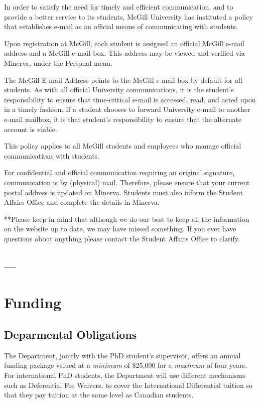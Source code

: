 \documentclass[
]{book}
\begin{document}
In order to satisfy the need for timely and efficient communication, and to provide a better service to its students, McGill University has instituted a policy that establishes e-mail as an official means of communicating with students.

Upon registration at McGill, each student is assigned an official McGill e-mail address and a McGill e-mail box. This address may be viewed and verified via Minerva, under the Personal menu.

The McGill E-mail Address points to the McGill e-mail box by default for all students. As with all official University communications, it is the student's responsibility to ensure that time-critical e-mail is accessed, read, and acted upon in a timely fashion. If a student chooses to forward University e-mail to another e-mail mailbox, it is that student's responsibility to ensure that the alternate account is viable.

This policy applies to all McGill students and employees who manage official communications with students.

For confidential and official communication requiring an original signature, communication is by (physical) mail. Therefore, please ensure that your current postal address is updated on Minerva. Students must also inform the Student Affairs Office and complete the details in Minerva.

**Please keep in mind that although we do our best to keep all the information on the website up to date, we may have missed something. If you ever have questions about anything please contact the Student Affairs Office to clarify.

\hypertarget{section-7}{%
\section{---}\label{section-7}}

\hypertarget{funding}{%
\chapter{Funding}\label{funding}}

\hypertarget{deparmental-obligations}{%
\section{Deparmental Obligations}\label{deparmental-obligations}}

The Department, jointly with the PhD student's supervisor, offers an annual funding package valued at a \emph{minimum} of \$25,000 for a \emph{maximum} of four years. For international PhD students, the Department will use different mechanisms such as Deferential Fee Waivers, to cover the International Differential tuition so that they pay tuition at the same level as Canadian students.
\end{document}
